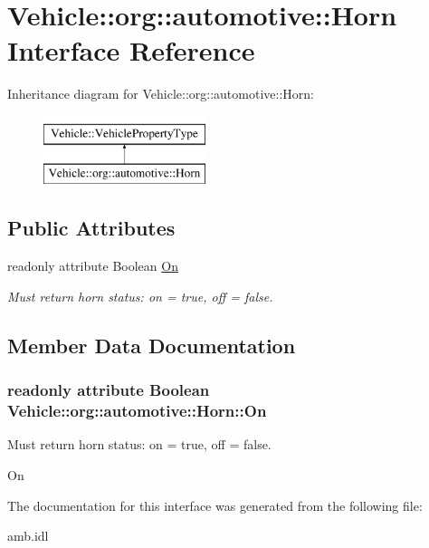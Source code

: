 \hypertarget{interfaceVehicle_1_1org_1_1automotive_1_1Horn}{\section{Vehicle\-:\-:org\-:\-:automotive\-:\-:Horn Interface Reference}
\label{interfaceVehicle_1_1org_1_1automotive_1_1Horn}
}
Inheritance diagram for Vehicle\-:\-:org\-:\-:automotive\-:\-:Horn\-:\begin{figure}[H]
\begin{center}
\leavevmode
\includegraphics[height=2.000000cm]{interfaceVehicle_1_1org_1_1automotive_1_1Horn}
\end{center}
\end{figure}
\subsection*{Public Attributes}
\begin{DoxyCompactItemize}
\item 
readonly attribute Boolean \hyperlink{interfaceVehicle_1_1org_1_1automotive_1_1Horn_ac1c2418c174687a14ba44c26eebe49a5}{On}
\begin{DoxyCompactList}\small\item\em Must return horn status\-: on = true, off = false. \end{DoxyCompactList}\end{DoxyCompactItemize}


\subsection{Member Data Documentation}
\hypertarget{interfaceVehicle_1_1org_1_1automotive_1_1Horn_ac1c2418c174687a14ba44c26eebe49a5}{
\subsubsection[{On}]{\setlength{\rightskip}{0pt plus 5cm}readonly attribute Boolean Vehicle\-::org\-::automotive\-::\-Horn\-::\-On}}\label{interfaceVehicle_1_1org_1_1automotive_1_1Horn_ac1c2418c174687a14ba44c26eebe49a5}


Must return horn status\-: on = true, off = false. 

On 

The documentation for this interface was generated from the following file\-:\begin{DoxyCompactItemize}
\item 
amb.\-idl\end{DoxyCompactItemize}
